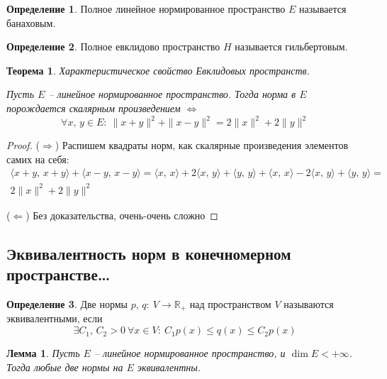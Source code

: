 \documentclass[a4paper,12pt]{article}
\renewcommand{\leq}{\ensuremath{\leqslant}}
\theoremstyle{plain}
\newtheorem{theorem}{Теорема}[section]
\newtheorem{lemma}{Лемма}[section]
\theoremstyle{definition}
\newtheorem{definition}{Определение}[section]
\theoremstyle{remark}
\begin{document}
\begin{definition}
	Полное линейное нормированное пространство $E$ называется банаховым.
\end{definition}

\begin{definition}
	Полное евклидово пространство $H$ называется гильбертовым.
\end{definition}

\begin{theorem}
	Характеристическое свойство Евклидовых пространств.

	Пусть $E$ -- линейное нормированное пространство. Тогда норма в $E$ порождается скалярным произведением $\Leftrightarrow$
	\[
		\forall x,\, y \in E :\: \|x + y\|^2 + \|x - y\|^2 = 2\|x\|^2 + 2\|y\|^2
	\]
\end{theorem}

\begin{proof}
	($\Rightarrow$) Распишем квадраты норм, как скалярные произведения элементов самих на себя:
	\begin{align*}
		\langle x + y,\, x + y\rangle + \langle x -y ,\, x - y\rangle = \langle x,\, x\rangle + 2\langle x,\, y\rangle + \langle y,\, y\rangle + \langle x,\, x\rangle - 2\langle x,\, y\rangle + \langle y,\, y\rangle = \\
		2\|x\|^2 + 2\|y\|^2
	\end{align*}

	($\Leftarrow$) Без доказательства, очень-очень сложно
\end{proof}

\subsection{Эквивалентность норм в конечномерном пространстве\dots}
\begin{definition}
	Две нормы $p,\, q :\: V \to \mathbb{R}_+$ над пространством $V$ называются эквивалентными, если
	\[
		\exists C_1,\, C_2 > 0 \: \forall x \in V :\: C_1p(x) \leq q(x) \leq C_2p(x)
	\]
\end{definition}

\begin{lemma}
	Пусть $E$ -- линейное нормированное пространство, и $\dim E < +\infty$. Тогда любые две нормы на $E$ эквивалентны.
\end{lemma}
\end{document}
